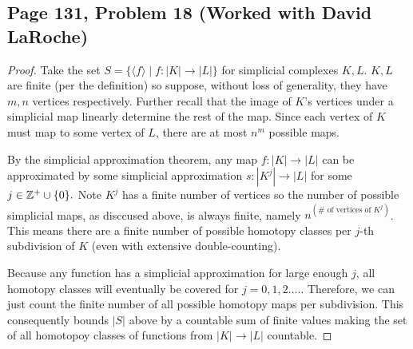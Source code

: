 \subsection*{Page 131, Problem 18 (Worked with David LaRoche)}
\vspace{15pt}
\begin{proof}
    \vspace{-10pt}
    Take the set $S = \{\langle f\rangle \mid f\colon |K| \to |L|\}$ for simplicial complexes $K, L$. $K, L$ are finite (per the definition) so suppose, without loss of generality, they have $m,n$ vertices respectively. Further recall that the image of $K$'s vertices under a simplicial map linearly determine the rest of the map. Since each vertex of $K$ must map to some vertex of $L$, there are at most $n^m$ possible maps.

    By the simplicial approximation theorem, any map $f\colon |K| \to |L|$ can be approximated by some simplicial approximation $s \colon |K^j| \to |L|$ for some $j \in \mathbb{Z}^+\cup\{0\}.$ Note $K^j$ has a finite number of vertices so the number of possible simplicial maps, as disccused above, is always finite, namely $n^{(\#\text{ of vertices of $K^j$})}$. This means there are a finite number of possible homotopy classes per $j$-th subdivision of $K$ (even with extensive double-counting). 
    
    Because any function has a simplicial approximation for large enough $j$, all homotopy classes will eventually be covered for $j = 0,1,2\ldots.$. Therefore, we can just count the finite number of all possible homotopy maps per subdivision. This consequently bounds $|S|$ above by a countable sum of finite values making the set of all homotopoy classes of functions from $|K| \to |L|$ countable.
\end{proof}